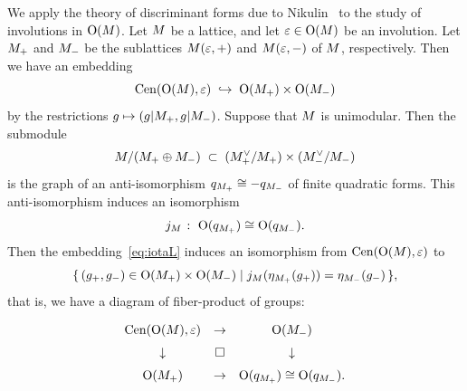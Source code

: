 \documentclass{amsart} %
\begin{document}
%
%
%
We apply the  theory of discriminant forms
due to Nikulin~\cite{MR525944}
to the study of involutions in $\mathord{\mathrm{O}}(M)$.
Let $M$ be a lattice, and 
let  $\varepsilon \in \mathord{\mathrm{O}}(M)$ be an involution.
Let $M_+$ and $M_-$ be the sublattices
$M(\varepsilon, +)$ and $M(\varepsilon, -)$ of $M$, respectively.
Then we have an embedding
%
\begin{equation}\label{eq:iotaL}
\mathrm{Cen}(\mathord{\mathrm{O}}(M), \varepsilon)\;\hookrightarrow\; \mathord{\mathrm{O}}(M_+)\times \mathord{\mathrm{O}}(M_-)
\end{equation}
%
by the restrictions $g\mapsto (g|M_+, g|M_-)$.
Suppose that $M$ is unimodular.
Then the submodule
\[
M/(M_+\oplus M_-) \;\subset\; (M_+^{\vee}/M_+)\times (M_-^{\vee}/M_-)
\]
is the graph of an anti-isomorphism
$q_{M_+} \cong -q_{M_-}$
of finite quadratic forms.
This anti-isomorphism
induces an isomorphism
\[
j_M\;\colon\; \mathord{\mathrm{O}}(q_{M_+}) \cong \mathord{\mathrm{O}}(q_{M_-}).
\]
Then the embedding~\eqref{eq:iotaL} induces an isomorphism from $\mathrm{Cen}(\mathord{\mathrm{O}}(M), \varepsilon)$ to 
%
\begin{equation*}\label{eq:CenL}
\{\,{(g_{+}, g_{-})\in \mathord{\mathrm{O}}(M_+)\times \mathord{\mathrm{O}}(M_-)}\mid {j_M(\eta_{M_+}(g_{+}))=\eta_{M_-}(g_{-})} \,\},
\end{equation*}
%
that is, we have a diagram of fiber-product of groups:
%
\begin{equation}\label{eq:groupfibprodCenvep}
\renewcommand{\arraystretch}{1.5}
\begin{array}{ccc}
\Cen(\OG(\dLat), \vep) &\to  & \OG(\dLatminus) \\
\downarrow & \square& \downarrow \\
\OG(\dLatplus) & \to & \OG(q_{\dLatplus}) \cong \OG(q_{\dLatminus}).
\end{array}
\end{equation}
%
%
\end{document}
